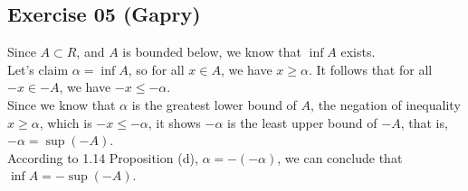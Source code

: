 \subsection*{Exercise 05 (Gapry)}
\begin{flushleft}
Since $A \subset R$, and $A$ is bounded below, we know that $\inf A$ exists.\\
\vspace{10px}
Let's claim $\alpha = \inf A$, so for all $x \in A$, we have $x \ge \alpha$. It follows that for all $-x \in -A$, we have $-x \le -\alpha$.\\
\vspace{10px}
Since we know that $\alpha$ is the greatest lower bound of $A$, the negation of inequality $x \ge \alpha$, which is $-x \le -\alpha$, it shows $-\alpha$ is the least upper bound of $-A$, that is, $-\alpha = \sup(-A)$. \\
\vspace{10px}
According to 1.14 Proposition (d), $\alpha = -(-\alpha)$, we can conclude that $\inf A = -\sup(-A)$.
\end{flushleft}
